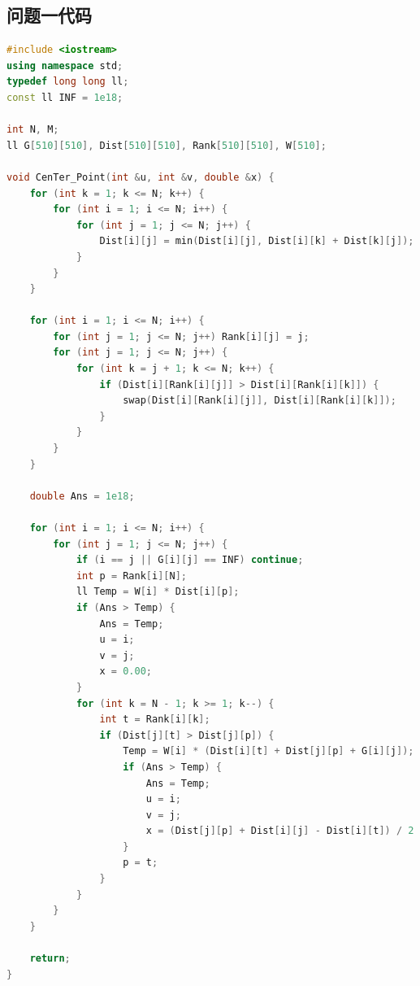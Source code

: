 \documentclass{cumcmthesis}
\begin{document}
\begin{appendices}


\section{问题一代码}

\begin{lstlisting}[language=cpp]
#include <iostream>
using namespace std;
typedef long long ll;
const ll INF = 1e18;

int N, M;
ll G[510][510], Dist[510][510], Rank[510][510], W[510];

void CenTer_Point(int &u, int &v, double &x) {
    for (int k = 1; k <= N; k++) {
        for (int i = 1; i <= N; i++) {
            for (int j = 1; j <= N; j++) {
                Dist[i][j] = min(Dist[i][j], Dist[i][k] + Dist[k][j]);
            }
        }
    }

    for (int i = 1; i <= N; i++) {
        for (int j = 1; j <= N; j++) Rank[i][j] = j;
        for (int j = 1; j <= N; j++) {
            for (int k = j + 1; k <= N; k++) {
                if (Dist[i][Rank[i][j]] > Dist[i][Rank[i][k]]) {
                    swap(Dist[i][Rank[i][j]], Dist[i][Rank[i][k]]);
                }
            }
        }
    }

    double Ans = 1e18;

    for (int i = 1; i <= N; i++) {
        for (int j = 1; j <= N; j++) {
            if (i == j || G[i][j] == INF) continue;
            int p = Rank[i][N];
            ll Temp = W[i] * Dist[i][p];
            if (Ans > Temp) {
                Ans = Temp;
                u = i;
                v = j;
                x = 0.00;
            }
            for (int k = N - 1; k >= 1; k--) {
                int t = Rank[i][k];
                if (Dist[j][t] > Dist[j][p]) {
                    Temp = W[i] * (Dist[i][t] + Dist[j][p] + G[i][j]);
                    if (Ans > Temp) {
                        Ans = Temp;
                        u = i;
                        v = j;
                        x = (Dist[j][p] + Dist[i][j] - Dist[i][t]) / 2.00;
                    }
                    p = t;
                }
            }
        }
    }

    return;
}
\end{lstlisting}

\end{appendices}
\end{document}
